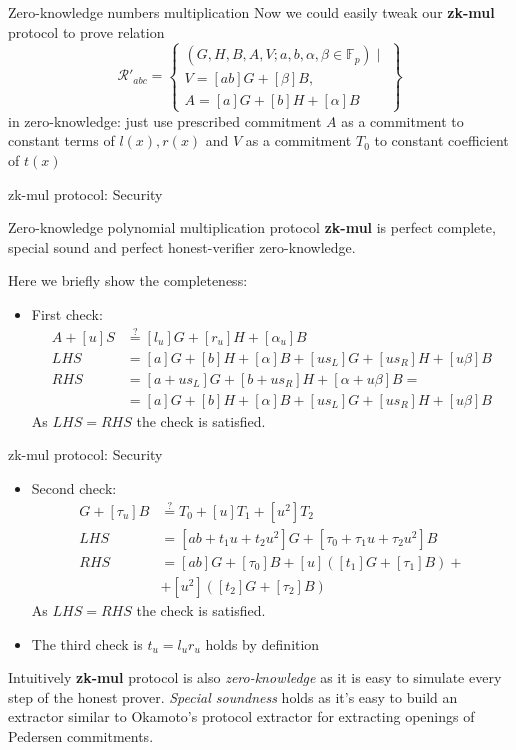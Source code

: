 \documentclass{zkdl-presentation-template}
\begin{document}
\begin{frame}{Zero-knowledge numbers multiplication}
    Now we could easily tweak our \textbf{zk-mul} protocol to prove relation     
    $$
    \mathcal{R}'_{abc} = \left\{\begin{array}{l}
        (G,H,B,A,V; a,b, \alpha, \beta \in \mathbb{F}_p) \mid \\
        V = [ab]G + [\beta]B, \\
        A = [a]G + [b]H + [\alpha]B
    \end{array}\right\}
    $$ 
    in zero-knowledge: just use prescribed commitment $A$ as a commitment to constant terms of $l(x), r(x)$ and $V$ as a commitment $T_0$ to constant coefficient of $t(x)$
\end{frame}

\begin{frame}{zk-mul protocol: Security}
    \begin{theorem}
        Zero-knowledge polynomial multiplication protocol \textbf{zk-mul} is perfect complete, special sound and perfect honest-verifier zero-knowledge.
    \end{theorem}
    Here we briefly show the completeness:
    \begin{itemize}
        \item First check: \begin{align*}
            A + [u]S &\stackrel{?}{=} [l_u]G + [r_u]H + [\alpha_u]B \\
            LHS &= [a]G + [b]H + [\alpha]B + [us_L]G + [us_R]H + [u\beta]B \\
            RHS &= [a+ u s_L]G + [b + u s_R]H + [\alpha + u \beta]B = \\
            &=[a]G + [b]H + [\alpha]B + [us_L]G + [us_R]H + [u\beta]B
        \end{align*}
        As $LHS = RHS$ the check is satisfied.
    \end{itemize}
\end{frame}

\begin{frame}{zk-mul protocol: Security}
    \begin{itemize}
        \item Second check: \begin{align*}
            [t_u]G + [\tau_u]B &\stackrel{?}{=} T_0 + [u]T_1 + [u^2]T_2 \\
            LHS &= [ab + t_1 u + t_2 u^2]G + [\tau_0 + \tau_1 u + \tau_2 u^2]B\\
            RHS &=[ab]G + [\tau_0]B + [u]([t_1]G + [\tau_1]B) + \\
            &+ [u^2]([t_2]G + [\tau_2]B)
        \end{align*}
        As $LHS = RHS$ the check is satisfied.
        \item The third check is $t_u = l_u r_u$ holds by definition
    \end{itemize}
    Intuitively \textbf{zk-mul} protocol is also \textit{zero-knowledge} as it is easy to simulate every step of the honest prover. \textit{Special soundness} holds as it's easy to build an extractor similar to Okamoto's protocol extractor for extracting openings of Pedersen commitments.
\end{frame}
\end{document}

